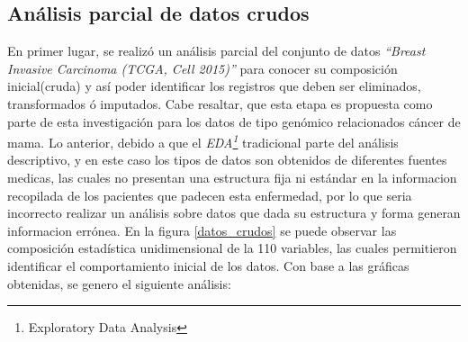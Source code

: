 \subsection{Análisis parcial de datos crudos}
En primer lugar, se realizó un análisis parcial del conjunto de datos \textit{“Breast Invasive Carcinoma (TCGA, Cell 2015)”} para conocer su composición inicial(cruda) y así poder identificar los registros que deben ser eliminados, transformados ó imputados. Cabe resaltar, que esta etapa es propuesta como parte de esta investigación para los datos de tipo genómico relacionados cáncer de mama. Lo anterior, debido a que el \textit{EDA\footnote{Exploratory Data Analysis}} tradicional parte del análisis descriptivo, y en este caso los tipos de datos son obtenidos de diferentes fuentes medicas, las cuales no presentan una estructura fija ni estándar en la informacion recopilada de los pacientes que padecen esta enfermedad, por lo que seria incorrecto realizar un análisis sobre datos que dada su estructura y forma generan informacion errónea. En la figura \ref{datos_crudos} se puede observar las composición estadística unidimensional de la 110 variables, las cuales permitieron identificar el comportamiento inicial de los datos. Con base a las gráficas obtenidas, se genero el siguiente análisis: 

